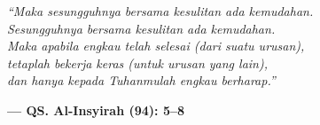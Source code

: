 \newpage
\thispagestyle{empty}

\vspace*{\fill}

\begin{center}
    \begin{minipage}{0.8\textwidth}
        \centering
        
        \vspace{0.5cm}
        
        {\itshape\large
        “Maka sesungguhnya bersama kesulitan ada kemudahan.\\
        Sesungguhnya bersama kesulitan ada kemudahan.\\
        Maka apabila engkau telah selesai (dari suatu urusan),\\
        tetaplah bekerja keras (untuk urusan yang lain),\\
        dan hanya kepada Tuhanmulah engkau berharap.”}
        
        \vspace{1cm}
        
        {\bfseries
        — QS. Al-Insyirah (94): 5–8}
        
        \vspace{0.5cm}
    \end{minipage}
\end{center}

\vspace*{\fill}